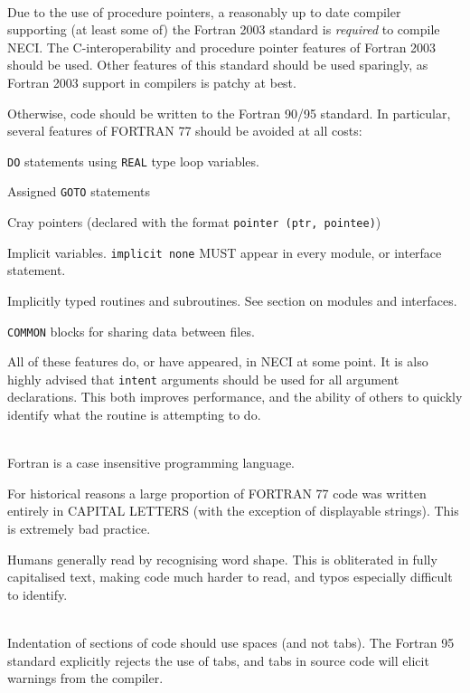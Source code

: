 \documentclass[a4paper,notitlepage]{scrreprt}
\newenvironment{packed_itemize}{
	\begin{itemize}
		\setlength{\itemsep}{1pt}
		\setlength{\parskip}{0pt}
		\setlength{\parsep}{0pt}
	}{\end{itemize}}
\newcommand\headitem[1]{\needspace{1.5\baselineskip}\item[{\boldmath #1 \nopagebreak}] \hfill \\ \nopagebreak}
\let\code\lstinline
\begin{document}
\begin{description}

	\headitem{Fortran standard}
		Due to the use of procedure pointers, a reasonably up to date compiler
		supporting (at least some of) the Fortran 2003 standard is 
		\emph{required} to compile NECI. The C-interoperability and procedure
		pointer features of Fortran 2003 should be used. Other features of this
		standard should be used sparingly, as Fortran 2003 support in compilers
		is patchy at best.

		Otherwise, code should be written to the Fortran 90/95 standard. In
		particular, several features of FORTRAN 77 should be avoided at all
		costs:
		\begin{packed_itemize}
			\item
				\code{DO} statements using \code{REAL} type loop
				variables.
			\item Assigned \code{GOTO} statements
			\item 
				Cray pointers (declared with the format
				\code{pointer (ptr, pointee)})
			\item
				Implicit variables. \code{implicit none} MUST appear in
				every module, or interface statement.
			\item
				Implicitly typed routines and subroutines. See section on
				modules and interfaces.
			\item
				\code{COMMON} blocks for sharing data between files.
		\end{packed_itemize}
		All of these features do, or have appeared, in NECI at some point. It is also highly advised that \code{intent} arguments should be used for all argument declarations. This both improves performance, and the ability of others to quickly identify what the routine is attempting to do.

	\headitem{CAPITAL letters}
		Fortran is a case insensitive programming language.

		For historical reasons a large proportion of FORTRAN 77 code was
		written entirely in CAPITAL LETTERS (with the exception of displayable
		strings). This is extremely bad practice.
		
		Humans generally read by recognising word shape. This is obliterated
		in fully capitalised text, making code much harder to read, and typos
		especially difficult to identify.

	\headitem{Indentation}
		Indentation of sections of code should use spaces (and not tabs). The
		Fortran 95 standard explicitly rejects the use of tabs, and tabs in
		source code will elicit warnings from the compiler.


\end{description}
\end{document}

